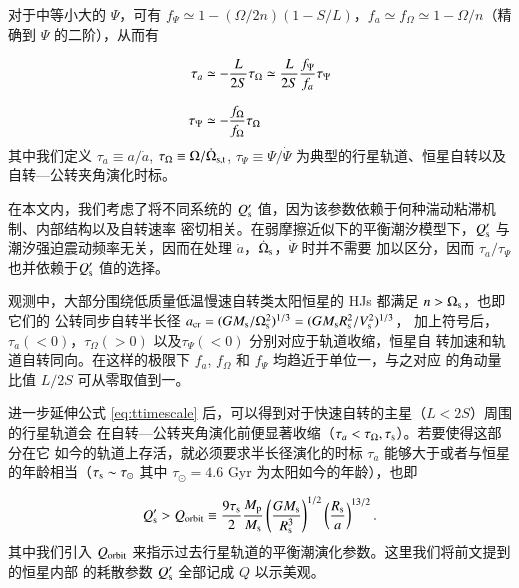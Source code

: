 对于中等小大的 $\Psi$，可有 $f_\Psi \simeq 1 - (\Omega/2n) (1-S/L)$，$f_a \simeq f_\Omega \simeq 1
 - \Omega/n$（精确到 $\Psi$ 的二阶），从而有
 
\begin{subequations} \label{eq:ttimescale}
\setlength{\jot}{10pt}
\begin{align}
    \tau_a &\simeq - \frac{L}{2S}\tau_\Omega \simeq \frac{L}{2S} \frac{f_\Psi}{f_a} \tau_\Psi \\
    \tau_\Psi &\simeq -\frac{f_\Omega}{f_\Omega} \tau_\Omega 
\end{align}
\end{subequations} 
其中我们定义 $\tau_a \equiv a /{\dot a}$,  $\tau_\Omega \equiv \Omega / {\dot \Omega}_{\mathrm{s, t}}$, 
$\tau_\Psi \equiv \Psi / {\dot \Psi}$ 为典型的行星轨道、恒星自转以及自转---公转夹角演化时标。

在本文内，我们考虑了将不同系统的 $Q_\mathrm{s}^\prime$ 值，因为该参数依赖于何种湍动粘滞机制\cite{
Zahn1977,Goldreich1989,Penev2007}、内部结构\cite{Terquem1998,Goodman2009}以及自转速率
\cite{Ogilvie2007,Barker2009}密切相关。在弱摩擦近似下的平衡潮汐模型下，$Q_\mathrm{s}^\prime$ 与
潮汐强迫震动频率无关，因而在处理 $\dot{a}$，$\dot{\Omega}_\mathrm{s}$，$\dot{\varPsi}$ 时并不需要
加以区分，因而 $\tau_a / \tau_\Psi$ 也并依赖于$Q_\mathrm{s}^\prime$ 值的选择。

观测中，大部分围绕低质量低温慢速自转类太阳恒星的 HJs 都满足 $n>\Omega_\mathrm{s}$，也即它们的
公转同步自转半长径 $a_\mathrm{cr} = (GM_\mathrm{s}/\Omega_\mathrm{s}^2)^{1/3} = (GM_\mathrm{s}R_\mathrm{s}^2/V_\mathrm{s}^2)^{1/3}$，
加上符号后，$\tau_a (<0)$，$\tau_\Omega (>0)$ 以及$\tau_\Psi (<0)$ 分别对应于轨道收缩，恒星自
转加速和轨道自转同向。在这样的极限下 $f_a$, $f_\Omega$ 和 $f_\Psi$ 均趋近于单位一，与之对应
的角动量比值 $L/2S$ 可从零取值到一。

进一步延伸公式 \ref{eq:ttimescale} 后，可以得到对于快速自转的主星（$L<2S$）周围的行星轨道会
在自转---公转夹角演化前便显著收缩（$\tau_a < \tau_{\Omega},\tau_\mathrm{s}$）。若要使得这部分在它
如今的轨道上存活，就必须要求半长径演化的时标 $\tau_a$ 能够大于或者与恒星的年龄相当（$\tau_
\mathrm{s}\sim \tau_\odot$ 其中 $\tau_\odot =4.6$ Gyr 为太阳如今的年龄），也即

\begin{equation} \label{eq:qorbit} 
Q_\mathrm{s}^\prime > Q_{\rm orbit} \equiv {9 \tau_\mathrm{s} \over 2} 
{M_\mathrm{p} \over M_\mathrm{s}}  \left( {G M_\mathrm{s} \over R_\mathrm{s}^3} \right)^{1/2}
\left({R_\mathrm{s} \over a} \right)^{13/2}.
\end{equation}  
其中我们引入 $Q_{\rm orbit}$ 来指示过去行星轨道的平衡潮演化参数。这里我们将前文提到的恒星内部
的耗散参数 $Q_\mathrm{s}^\prime $ 全部记成 $Q$ 以示美观。

